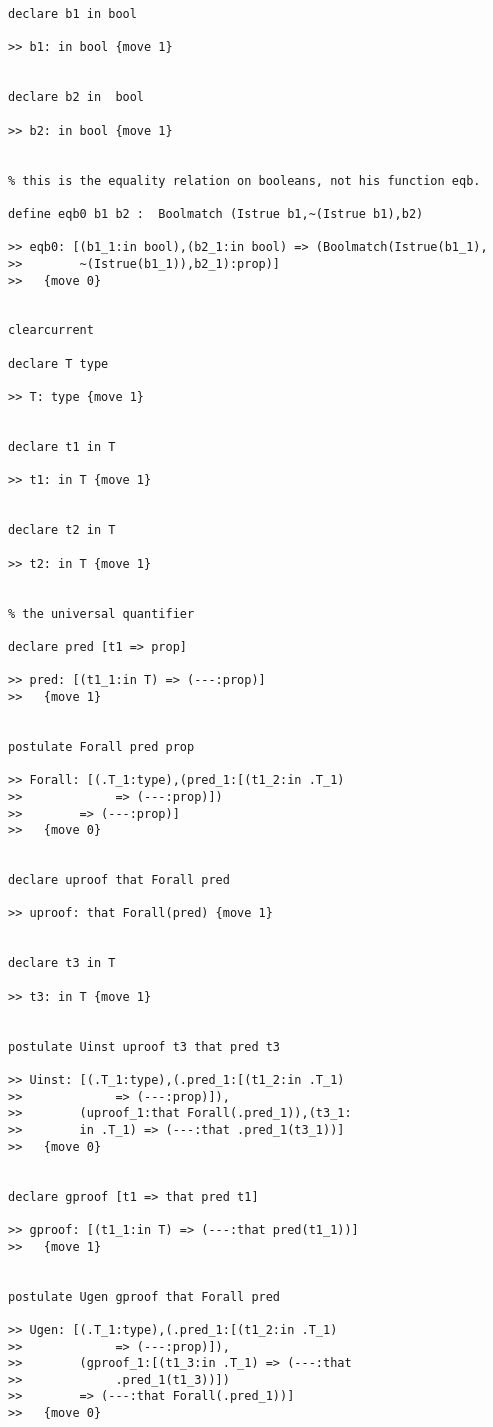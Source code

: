 \documentclass[12pt]{article}
\begin{document}
\begin{verbatim}
declare b1 in bool

>> b1: in bool {move 1}


declare b2 in  bool

>> b2: in bool {move 1}


% this is the equality relation on booleans, not his function eqb.

define eqb0 b1 b2 :  Boolmatch (Istrue b1,~(Istrue b1),b2)

>> eqb0: [(b1_1:in bool),(b2_1:in bool) => (Boolmatch(Istrue(b1_1),
>>        ~(Istrue(b1_1)),b2_1):prop)]
>>   {move 0}


clearcurrent

declare T type

>> T: type {move 1}


declare t1 in T

>> t1: in T {move 1}


declare t2 in T

>> t2: in T {move 1}


% the universal quantifier

declare pred [t1 => prop]

>> pred: [(t1_1:in T) => (---:prop)]
>>   {move 1}


postulate Forall pred prop

>> Forall: [(.T_1:type),(pred_1:[(t1_2:in .T_1) 
>>             => (---:prop)])
>>        => (---:prop)]
>>   {move 0}


declare uproof that Forall pred

>> uproof: that Forall(pred) {move 1}


declare t3 in T

>> t3: in T {move 1}


postulate Uinst uproof t3 that pred t3

>> Uinst: [(.T_1:type),(.pred_1:[(t1_2:in .T_1) 
>>             => (---:prop)]),
>>        (uproof_1:that Forall(.pred_1)),(t3_1:
>>        in .T_1) => (---:that .pred_1(t3_1))]
>>   {move 0}


declare gproof [t1 => that pred t1]

>> gproof: [(t1_1:in T) => (---:that pred(t1_1))]
>>   {move 1}


postulate Ugen gproof that Forall pred

>> Ugen: [(.T_1:type),(.pred_1:[(t1_2:in .T_1) 
>>             => (---:prop)]),
>>        (gproof_1:[(t1_3:in .T_1) => (---:that 
>>             .pred_1(t1_3))])
>>        => (---:that Forall(.pred_1))]
>>   {move 0}



\end{verbatim}
\end{document}
